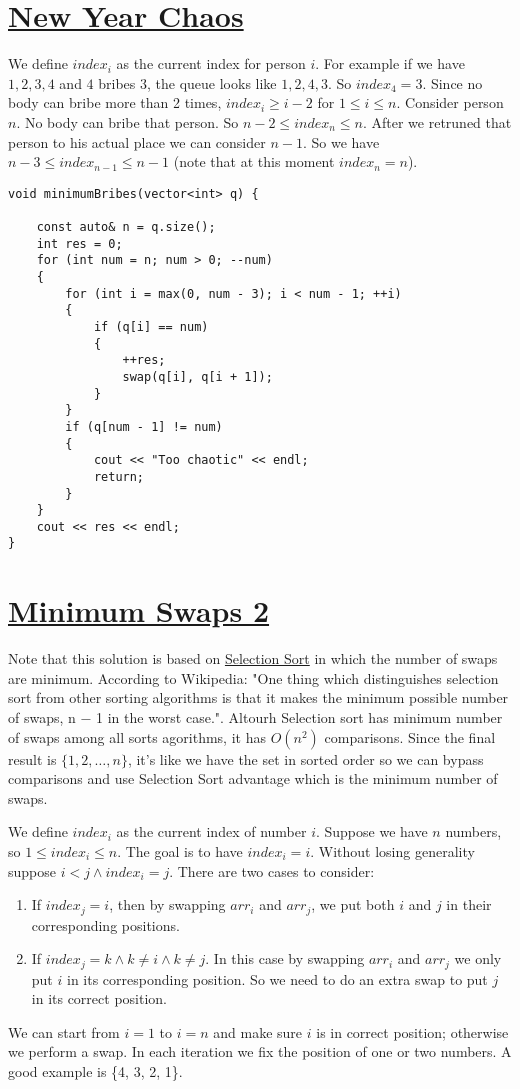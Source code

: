 \documentclass{book}
\begin{document}
	\section{\href{https://www.hackerrank.com/challenges/new-year-chaos/problem}{New Year Chaos}}
	 We define $index_i$ as the current index for person $i$. For example if we have $1, 2, 3, 4$ and $4$ bribes $3$, the queue looks like $1, 2, 4, 3$. So $index_4 = 3$. Since no body can bribe more than 2 times, $index_i \ge i - 2$ for $1 \le i \le n$. Consider person $n$. No body can bribe that person. So $n - 2 \le index_n \le n$. After we retruned that person to his actual place we can consider $n - 1$. So we have $n - 3 \le index_{n - 1} \le n - 1$ (note that at this moment $index_n = n$).
	 \begin{lstlisting}
void minimumBribes(vector<int> q) {

    const auto& n = q.size();
    int res = 0;
    for (int num = n; num > 0; --num)
    {
        for (int i = max(0, num - 3); i < num - 1; ++i)
        {
            if (q[i] == num)
            {
                ++res;
                swap(q[i], q[i + 1]);
            }
        }
        if (q[num - 1] != num)
        {
            cout << "Too chaotic" << endl;
            return;
        }
    }
    cout << res << endl;
}
	 \end{lstlisting}
	 
	 \section{\href{https://www.hackerrank.com/challenges/minimum-swaps-2/problem}{Minimum Swaps 2}}
 	Note that this solution is based on \href{https://en.wikipedia.org/wiki/Selection_sort}{Selection Sort} in which the number of swaps are minimum. According to Wikipedia: "One thing which distinguishes selection sort from other sorting algorithms is that it makes the minimum possible number of swaps, n − 1 in the worst case.". Altourh Selection sort has minimum number of swaps among all sorts agorithms, it has $O(n^2)$ comparisons. Since the final result is $\{1, 2, \dots, n\}$, it's like we have the set in sorted order so we can bypass comparisons and use Selection Sort advantage which is the minimum number of swaps.
	 \par We define $index_i$ as the current index of number $i$. Suppose we have $n$ numbers, so $1 \le index_i \le n$. The goal is to have $index_i = i$. Without losing generality suppose $i < j \land index_i = j$. There are two cases to consider:
	 \begin{enumerate}
	 	\item If $index_j = i$, then by swapping $arr_i$ and $arr_j$, we put both $i$ and $j$ in their corresponding positions.
	 	\item If $index_j = k \land k \ne i \land k \ne j$. In this case by swapping $arr_i$ and $arr_j$ we only put $i$ in its corresponding position. So we need to do an extra swap to put $j$ in its correct position.
	 \end{enumerate}
 	We can start from $i = 1$ to $i = n$ and make sure $i$ is in correct position; otherwise we perform a swap. In each iteration we fix the position of one or two numbers. A good example is \{4, 3, 2, 1\}.
 	
\end{document}
